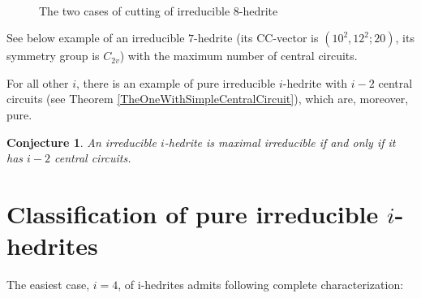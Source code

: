 \documentclass[12pt]{article}
\newtheorem{conjecture}{Conjecture}
\newcommand{\proof}{\noindent{\bf Proof.}\ \ }
\begin{document}
\begin{figure}
\centering
\mbox{
}
\caption{The two cases of cutting of irreducible $8$-hedrite}
\label{TwoCasesCutting}
\end{figure}


















See below example of an irreducible $7$-hedrite (its CC-vector is $(10^2, 12^2; 20)$, its symmetry group is $C_{2v}$) with the maximum number of central circuits.


\begin{center}
\epsfxsize=60mm
\end{center}

For all other $i$, there is an example of pure irreducible $i$-hedrite with $i-2$ central circuits (see 
Theorem \ref{TheOneWithSimpleCentralCircuit}), which are, moreover, pure.















\begin{conjecture}
An irreducible $i$-hedrite is maximal irreducible if and only if it has $i-2$ central circuits.
\end{conjecture}



\section{Classification of pure irreducible $i$-hedrites}
The easiest case, $i=4$, of i-hedrites admits following complete
characterization:
\end{document}
